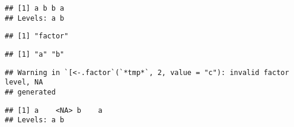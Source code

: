 \begin{Shaded}
\begin{Highlighting}[]
\StringTok{ }\NormalTok{(}\NormalTok{(}\NormalTok{, }\NormalTok{, }\NormalTok{, }\NormalTok{))}
\end{Highlighting}
\end{Shaded}

\begin{verbatim}
## [1] a b b a
## Levels: a b
\end{verbatim}

\begin{Shaded}
\begin{Highlighting}[]
\end{Highlighting}
\end{Shaded}

\begin{verbatim}
## [1] "factor"
\end{verbatim}

\begin{Shaded}
\begin{Highlighting}[]
\end{Highlighting}
\end{Shaded}

\begin{verbatim}
## [1] "a" "b"
\end{verbatim}

\begin{Shaded}
\begin{Highlighting}[]
\NormalTok{x[}\NormalTok{] <-}
\end{Highlighting}
\end{Shaded}

\begin{verbatim}
## Warning in `[<-.factor`(`*tmp*`, 2, value = "c"): invalid factor level, NA
## generated
\end{verbatim}

\begin{Shaded}
\begin{Highlighting}[]
\end{Highlighting}
\end{Shaded}

\begin{verbatim}
## [1] a    <NA> b    a   
## Levels: a b
\end{verbatim}

